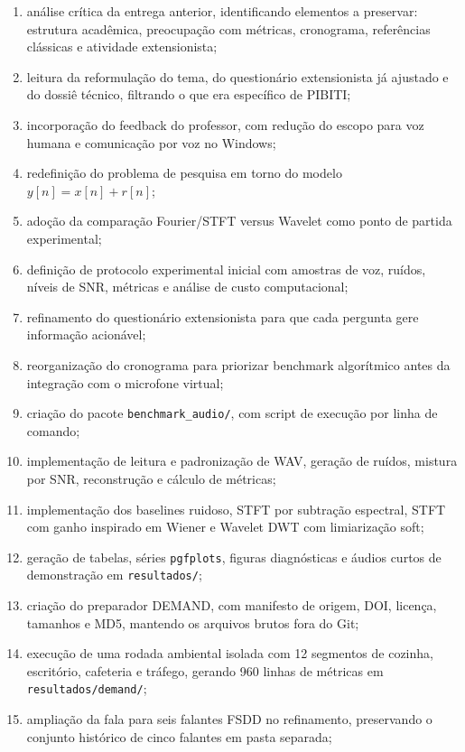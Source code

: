 \begin{enumerate}[label=\arabic*.]
    \item análise crítica da entrega anterior, identificando elementos a preservar: estrutura acadêmica, preocupação com métricas, cronograma, referências clássicas e atividade extensionista;
    \item leitura da reformulação do tema, do questionário extensionista já ajustado e do dossiê técnico, filtrando o que era específico de PIBITI;
    \item incorporação do feedback do professor, com redução do escopo para voz humana e comunicação por voz no Windows;
    \item redefinição do problema de pesquisa em torno do modelo \(y[n]=x[n]+r[n]\);
    \item adoção da comparação Fourier/STFT versus Wavelet como ponto de partida experimental;
    \item definição de protocolo experimental inicial com amostras de voz, ruídos, níveis de SNR, métricas e análise de custo computacional;
    \item refinamento do questionário extensionista para que cada pergunta gere informação acionável;
    \item reorganização do cronograma para priorizar benchmark algorítmico antes da integração com o microfone virtual;
    \item criação do pacote \texttt{benchmark\_audio/}, com script de execução por linha de comando;
    \item implementação de leitura e padronização de WAV, geração de ruídos, mistura por SNR, reconstrução e cálculo de métricas;
    \item implementação dos baselines ruidoso, STFT por subtração espectral, STFT com ganho inspirado em Wiener e Wavelet DWT com limiarização soft;
    \item geração de tabelas, séries \texttt{pgfplots}, figuras diagnósticas e áudios curtos de demonstração em \texttt{resultados/};
    \item criação do preparador DEMAND, com manifesto de origem, DOI, licença, tamanhos e MD5, mantendo os arquivos brutos fora do Git;
    \item execução de uma rodada ambiental isolada com 12 segmentos de cozinha, escritório, cafeteria e tráfego, gerando 960 linhas de métricas em \texttt{resultados/demand/};
    \item ampliação da fala para seis falantes FSDD no refinamento, preservando o conjunto histórico de cinco falantes em pasta separada;

\end{enumerate}
